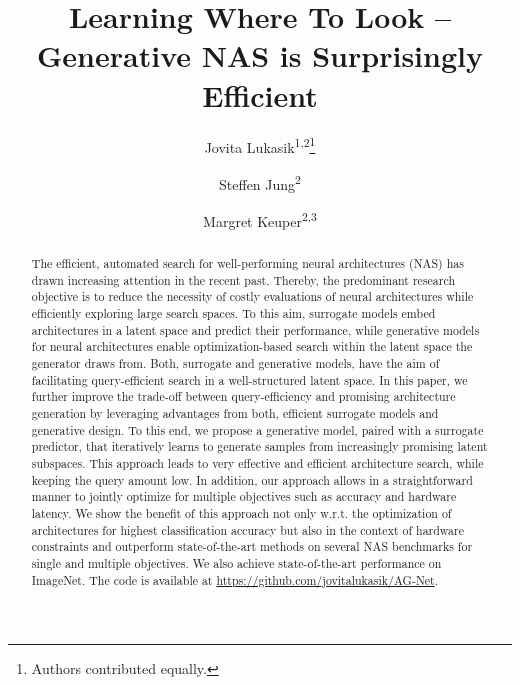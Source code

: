\documentclass[runningheads]{llncs}
\newcommand*\samethanks[1][\value{footnote}]{\footnotemark[#1]}
\begin{document}
\pagestyle{headings}
\mainmatter
\def\ECCVSubNumber{6011}  


\title{Learning Where To Look -- \\Generative NAS is Surprisingly Efficient}
\begin{comment}
\titlerunning{ECCV-22 submission ID \ECCVSubNumber} 
\authorrunning{ECCV-22 submission ID \ECCVSubNumber} 
\author{Anonymous ECCV submission}
\institute{Paper ID \ECCVSubNumber}
\end{comment}


\author{
  Jovita Lukasik\textsuperscript{\rm 1,2}\thanks{Authors contributed equally.} \and Steffen Jung\textsuperscript{\rm 2}\samethanks{} \and Margret Keuper\textsuperscript{\rm 2,3}}
\maketitle

\begin{abstract}
The efficient, automated search for well-performing neural architectures (NAS) has drawn increasing attention in the recent past. 
Thereby, the predominant research objective is to reduce the necessity of costly evaluations of neural architectures while efficiently exploring large search spaces. 
To this aim, surrogate models embed architectures in a latent space and predict their performance, while generative models for neural architectures enable optimization-based search within the latent space the generator draws from. Both, surrogate and generative models, have the aim of facilitating query-efficient search in a well-structured latent space. In this paper, we further improve the trade-off between query-efficiency and promising architecture generation by leveraging advantages from both, efficient surrogate models and generative design. To this end, we propose a generative model, paired with a surrogate predictor, that iteratively learns to generate samples from increasingly promising latent subspaces.  
This approach leads to very effective and efficient architecture search, while keeping the query amount low. 
In addition, our approach allows in a straightforward manner to jointly optimize for multiple objectives such as accuracy and hardware latency. 
We show the benefit of this approach not only w.r.t. the optimization of architectures for highest classification accuracy but also in the context of hardware constraints and outperform state-of-the-art methods on several NAS benchmarks for single and multiple objectives. We also achieve state-of-the-art performance on ImageNet. 
The code is available at \url{https://github.com/jovitalukasik/AG-Net}.




\end{abstract}
\end{document}
